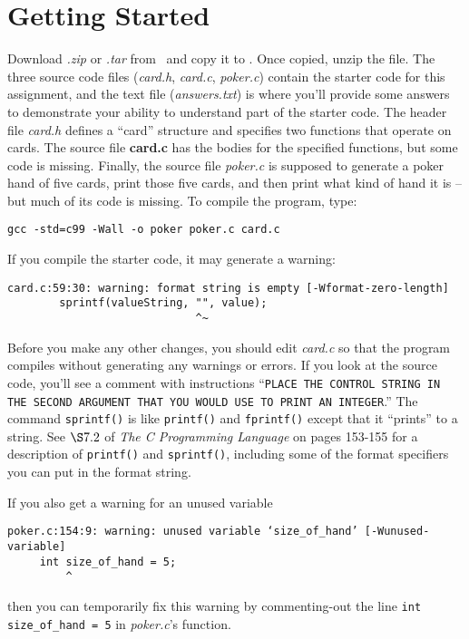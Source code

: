 \section{Getting Started}

Download \textit{\shortlabname.zip} or \textit{\shortlabname.tar} from
\filesource\ and copy it to \runtimeenvironment. Once copied, unzip the file.
The three source code files (\textit{card.h}, \textit{card.c},
\textit{poker.c}) contain the starter code for this assignment, and the text
file (\textit{answers.txt}) is where you'll provide some answers to demonstrate
your ability to understand part of the starter code. The header file
\textit{card.h} defines a ``card'' structure and specifies two functions that
operate on cards. The source file \textbf{card.c} has the bodies for the
specified functions, but some code is missing. Finally, the source file
\textit{poker.c} is supposed to generate a poker hand of five cards, print
those five cards, and then print what kind of hand it is -- but much of its
code is missing. To compile the program, type:

\texttt{gcc -std=c99 -Wall -o poker poker.c card.c}

If you compile the starter code, it may generate a warning:

\begin{verbatim}
card.c:59:30: warning: format string is empty [-Wformat-zero-length]
        sprintf(valueString, "", value);
                             ^~
\end{verbatim}

Before you make any other changes, you should edit \textit{card.c} so that the
program compiles without generating any warnings or errors. If you look at the
source code, you'll see a comment with instructions ``\texttt{PLACE THE CONTROL
STRING IN THE SECOND ARGUMENT THAT YOU WOULD USE TO PRINT AN INTEGER}.'' The
command \lstinline{sprintf()} is like \lstinline{printf()} and
\lstinline{fprintf()} except that it ``prints'' to a string. See $\S7.2$ of
\textit{The C Programming Language} on pages 153-155 for a description of
\lstinline{printf()} and \lstinline{sprintf()}, including some of the format
specifiers you can put in the format string.

If you also get a warning for an unused variable
\begin{verbatim}
poker.c:154:9: warning: unused variable ‘size_of_hand’ [-Wunused-variable]
     int size_of_hand = 5;
         ^
\end{verbatim}
then you can temporarily fix this warning by commenting-out the line
\lstinline{int size_of_hand = 5} in \textit{poker.c}'s 
function.

